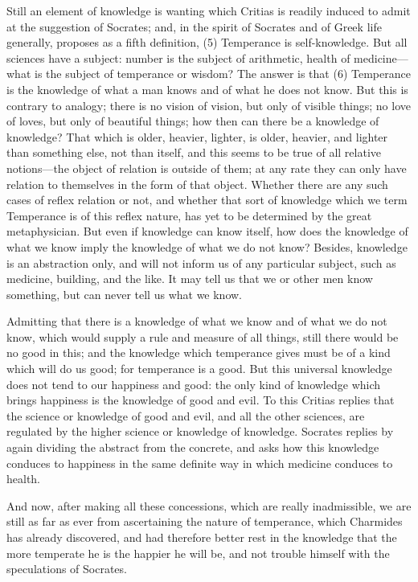 \documentclass[11pt,letter]{article}
\begin{document}
\par  Still an element of knowledge is wanting which Critias is readily induced to admit at the suggestion of Socrates; and, in the spirit of Socrates and of Greek life generally, proposes as a fifth definition, (5) Temperance is self-knowledge. But all sciences have a subject: number is the subject of arithmetic, health of medicine—what is the subject of temperance or wisdom? The answer is that (6) Temperance is the knowledge of what a man knows and of what he does not know. But this is contrary to analogy; there is no vision of vision, but only of visible things; no love of loves, but only of beautiful things; how then can there be a knowledge of knowledge? That which is older, heavier, lighter, is older, heavier, and lighter than something else, not than itself, and this seems to be true of all relative notions—the object of relation is outside of them; at any rate they can only have relation to themselves in the form of that object. Whether there are any such cases of reflex relation or not, and whether that sort of knowledge which we term Temperance is of this reflex nature, has yet to be determined by the great metaphysician. But even if knowledge can know itself, how does the knowledge of what we know imply the knowledge of what we do not know? Besides, knowledge is an abstraction only, and will not inform us of any particular subject, such as medicine, building, and the like. It may tell us that we or other men know something, but can never tell us what we know.

\par  Admitting that there is a knowledge of what we know and of what we do not know, which would supply a rule and measure of all things, still there would be no good in this; and the knowledge which temperance gives must be of a kind which will do us good; for temperance is a good. But this universal knowledge does not tend to our happiness and good: the only kind of knowledge which brings happiness is the knowledge of good and evil. To this Critias replies that the science or knowledge of good and evil, and all the other sciences, are regulated by the higher science or knowledge of knowledge. Socrates replies by again dividing the abstract from the concrete, and asks how this knowledge conduces to happiness in the same definite way in which medicine conduces to health.

\par  And now, after making all these concessions, which are really inadmissible, we are still as far as ever from ascertaining the nature of temperance, which Charmides has already discovered, and had therefore better rest in the knowledge that the more temperate he is the happier he will be, and not trouble himself with the speculations of Socrates.
\end{document}

